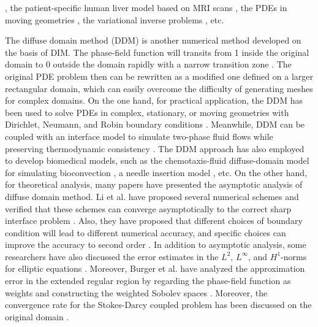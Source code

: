 \documentclass[3p,times]{elsarticle}
\numberwithin{equation}{section}
\begin{document}
\cite{TeigenLi2009,TorabiLowengrub2009}, the patient-specific human liver model based on MRI scans \cite{Stoter2017}, the PDEs in moving geometries \cite{ElliottStinner2011}, the variational inverse problems \cite{BurgerElvetun2015}, etc. 

The diffuse domain method (DDM) \cite{AndersonMcFadden1998,AndreasAxel2006} is another numerical method developed on the basis of DIM. The phase-field function will transits from 1 inside the original domain to 0 outside the domain rapidly with a narrow transition zone \cite{KarlLowengrub2015}. The original PDE problem then can be rewritten as a modified one defined on a larger rectangular domain, which can easily overcome the difficulty of generating meshes for complex domains. On the one hand, for practical application, the DDM has been used to solve PDEs in complex, stationary, or moving geometries with Dirichlet, Neumann, and Robin boundary conditions \cite{LiLowengrub2009}. Meanwhile, DDM can be coupled with an interface model to simulate two-phase fluid flows while preserving thermodynamic consistency \cite{GuoYu2021}. The DDM approach has also  employed to develop biomedical models, such as the chemotaxis-fluid diffuse-domain model for simulating bioconvection \cite{WangChertock2023}, a needle insertion model \cite{Jerg2020}, etc. On the other hand, for theoretical analysis, many papers have presented the asymptotic analysis of diffuse domain method. Li et al. have proposed several numerical schemes and verified that these schemes can converge asymptotically to the correct sharp interface problem \cite{LiLowengrub2009}. Also, they have proposed that different choices of boundary condition will lead to different numerical accuracy, and specific choices can improve the accuracy to second order \cite{KarlLowengrub2015, AlandLowengrub2010}. In addition to asymptotic analysis, some researchers have also discussed the error estimates in the $L^2$, $L^{\infty}$, and $H^1$-norms for elliptic equations \cite{FranzRoos2012, Schlottbom2016}. Moreover, Burger et al. have analyzed the approximation error in the extended regular region by regarding the phase-field function as weights and constructing the weighted Sobolev spaces \cite{BurgerElvetun2017}. Moreover, the convergence rate for the Stokes-Darcy coupled problem has been discussed on the original domain \cite{MartinaBoris2023}.
\end{document}
